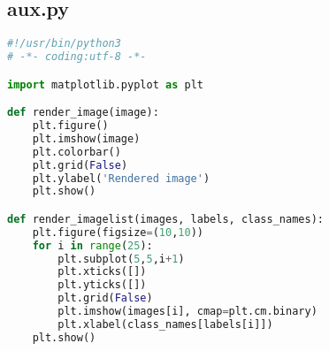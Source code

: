 \subsection{aux.py}

\begin{lstlisting}[language=python]
#!/usr/bin/python3
# -*- coding:utf-8 -*-

import matplotlib.pyplot as plt

def render_image(image):
    plt.figure()
    plt.imshow(image)
    plt.colorbar()
    plt.grid(False)
    plt.ylabel('Rendered image')
    plt.show()

def render_imagelist(images, labels, class_names):
    plt.figure(figsize=(10,10))
    for i in range(25):
        plt.subplot(5,5,i+1)
        plt.xticks([])
        plt.yticks([])
        plt.grid(False)
        plt.imshow(images[i], cmap=plt.cm.binary)
        plt.xlabel(class_names[labels[i]])
    plt.show()
\end{lstlisting}

